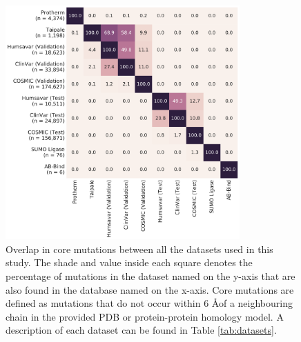 \clearpage

\begin{figure}[tb]
	\centering
	\includegraphics[width=0.8\textwidth]{static/elaspic_training_set/data_statistics/training_set_overlap_data_df_tt_core.pdf}
	\caption[Overlap in core mutation datasets.]{
    Overlap in core mutations between all the datasets used in this study.
    The shade and value inside each square denotes the percentage of mutations in the dataset named on the y-axis that are also found in the database named on the x-axis.
    Core mutations are defined as mutations that do not occur within 6 \AA of a neighbouring chain in the provided PDB or protein-protein homology model.
    A description of each dataset can be found in Table \ref{tab:datasets}.
    }
    \label{fig:training_set_overlap_core}
\end{figure}

\clearpage

